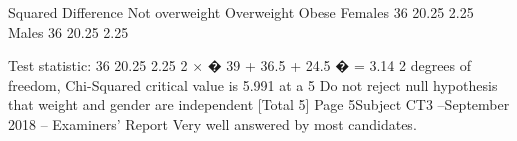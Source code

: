 \documentclass[a4paper,12pt]{article}
\begin{document}
Squared Difference
Not overweight Overweight Obese
Females
36
20.25
2.25
Males
36
20.25
2.25

Test statistic:
36
20.25
2.25
2 × � 39 + 36.5 + 24.5 � = 3.14 
2 degrees of freedom, Chi-Squared critical value is 5.991 at a 5%
Do not reject null hypothesis that weight and gender are independent 
[Total 5]
Page 5Subject CT3  –September 2018 – Examiners’ Report
Very well answered by most candidates.
\end{document}
